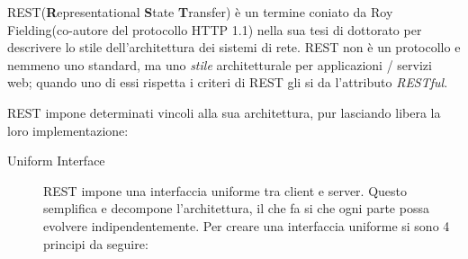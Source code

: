 REST(\textbf{R}epresentational \textbf{S}tate \textbf{T}ransfer) è un termine coniato da Roy Fielding(co-autore del protocollo HTTP 1.1) nella sua tesi di dottorato per descrivere lo stile dell'architettura dei sistemi di rete. REST non è un protocollo e nemmeno uno standard, ma uno \emph{stile} architetturale per applicazioni / servizi web; quando uno di essi rispetta i criteri di REST gli si da l'attributo \emph{RESTful}.

REST impone determinati vincoli alla sua architettura, pur lasciando libera la loro implementazione:

\begin{description}

\item[Uniform Interface] 

REST impone una interfaccia uniforme tra client e server. Questo semplifica e decompone l'architettura, il che fa si che ogni parte possa evolvere indipendentemente. Per creare una interfaccia uniforme si sono 4 principi da seguire:
\end{description}
